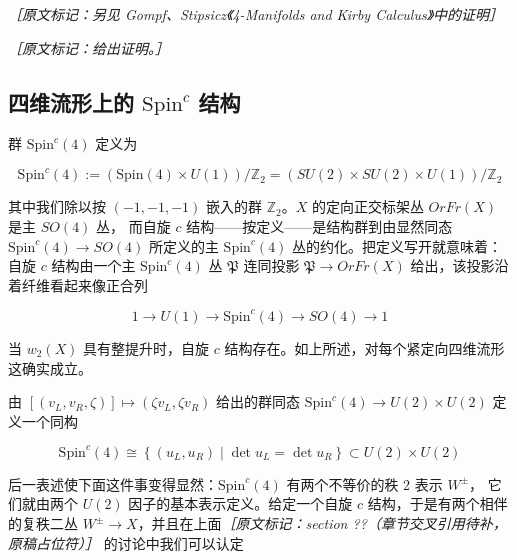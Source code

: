 \begin{enumerate}
    {\small\itshape ［原文标记：另见 Gompf、Stipsicz《4-Manifolds and Kirby Calculus》中的证明］}


    {\small\itshape ［原文标记：给出证明。］}

\end{enumerate}

\subsection{四维流形上的 $\mathrm{Spin}^c$ 结构} %

群 $\mathrm{Spin}^c(4)$ 定义为

\begin{equation}
  \mathrm{Spin}^c(4) := \left(\mathrm{Spin}(4)\times U(1)\right)/\mathbb{Z}_2
  = \left(SU(2)\times SU(2)\times U(1)\right)/\mathbb{Z}_2
  \tag{G.17}
  \label{eq:G.17}
\end{equation}

其中我们除以按 $(-1,-1,-1)$ 嵌入的群 $\mathbb{Z}_2$。$X$ 的定向正交标架丛 $OrFr(X)$ 是主 $SO(4)$ 丛，
而自旋 $c$ 结构——按定义——是结构群到由显然同态 $\mathrm{Spin}^c(4)\to SO(4)$ 所定义的主
$\mathrm{Spin}^c(4)$ 丛的约化。把定义写开就意味着：自旋 $c$ 结构由一个主 $\mathrm{Spin}^c(4)$ 丛
$\mathfrak{P}$ 连同投影 $\mathfrak{P}\to OrFr(X)$ 给出，该投影沿着纤维看起来像正合列

\begin{equation}
  1 \to U(1) \to \mathrm{Spin}^c(4) \to SO(4) \to 1
  \tag{G.18}
  \label{eq:G.18}
\end{equation}

当 $w_2(X)$ 具有整提升时，自旋 $c$ 结构存在。如上所述，对每个紧定向四维流形这确实成立。

由 $[(v_L,v_R,\zeta)]\mapsto(\zeta v_L,\zeta v_R)$ 给出的群同态
$\mathrm{Spin}^c(4)\to U(2)\times U(2)$ 定义一个同构

\begin{equation}
  \mathrm{Spin}^c(4) \cong \left\{ (u_L,u_R)\mid \det u_L = \det u_R \right\}
  \subset U(2)\times U(2)
  \tag{G.19}
  \label{eq:G.19}
\end{equation}

后一表述使下面这件事变得显然：$\mathrm{Spin}^c(4)$ 有两个不等价的秩 2 表示 $W^{\pm}$，
它们就由两个 $U(2)$ 因子的基本表示定义。给定一个自旋 $c$ 结构，于是有两个相伴的复秩二丛
$W^{\pm}\to X$，并且在上面{\small\itshape ［原文标记：section ??（章节交叉引用待补，原稿占位符）］}
的讨论中我们可以认定

